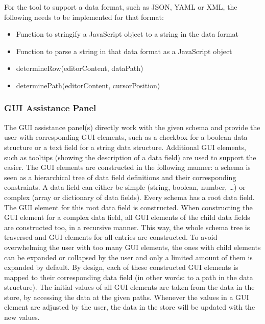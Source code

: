 For the tool to support a data format, such as JSON, YAML or XML, the following needs to be implemented for that format:
\begin{itemize}
	\item Function to stringify a JavaScript object to a string in the data format
	\item Function to parse a string in that data format as a JavaScript object
	\item determineRow(editorContent, dataPath)
	\item determinePath(editorContent, cursorPosition)
\end{itemize}


\subsubsection{GUI Assistance Panel}
The GUI assistance panel(s) directly work with the given schema and provide the user with corresponding GUI elements, such as a checkbox for a boolean data structure or a text field for a string data structure.
Additional GUI elements, such as tooltips (showing the description of a data field) are used to support the easier.
The GUI elements are constructed in the following manner: a schema is seen as a hierarchical tree of data field definitions and their corresponding constraints.
A data field can either be simple (string, boolean, number, \ldots) or complex (array or dictionary of data fields).
Every schema has a root data field.
The GUI element for this root data field is constructed. %
When constructing the GUI element for a complex data field, all GUI elements of the child data fields are constructed too, in a recursive manner.
This way, the whole schema tree is traversed and GUI elements for all entries are constructed.
To avoid overwhelming the user with too many GUI elements, the ones with child elements can be expanded or collapsed by the user and only a limited amount of them is expanded by default.
By design, each of these constructed GUI elements is mapped to their corresponding data field (in other words: to a path in the data structure).
The initial values of all GUI elements are taken from the data in the store, by accessing the data at the given paths.
Whenever the values in a GUI element are adjusted by the user, the data in the store will be updated with the new values.


%

